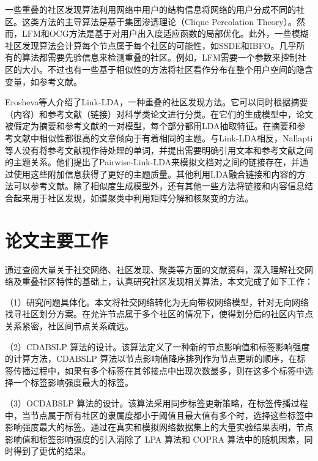 一些重叠的社区发现算法利用网络中用户的结构信息将网络的用户分成不同的社区。这类方法的主导算法是基于集团渗透理论（Clique Percolation Theory）\cite{Palla2005Uncovering}。然而，LFM和OCG方法是基于对用户出入度适应函数的局部优化\cite{Lancichinetti2012Detecting,Becker2012Multifunctional}。此外，一些模糊社区发现算法会计算每个节点属于每个社区的可能性，如SSDE和IBFO\cite{Magdon2010SSDE,Lei2013Clustering}。几乎所有的算法都需要先验信息来检测重叠的社区。例如，LFM需要一个参数来控制社区的大小。不过也有一些基于相似性的方法将社区看作分布在整个用户空间的隐含变量，如参考文献\cite{Ren2007A}。

Erosheva等人\cite{Erosheva2004Mixed}介绍了Link-LDA，一种重叠的社区发现方法。它可以同时根据摘要（内容）和参考文献（链接）对科学类论文进行分类。在它们的生成模型中，论文被假定为摘要和参考文献的一对模型，每个部分都用LDA抽取特征。在摘要和参考文献中相似性都很高的文章倾向于有着相同的主题。与Link-LDA相反，Nallapti等人\cite{Nallapati2008Joint}没有将参考文献视作待处理的单词，并提出需要明确引用文本和参考文献之间的主题关系。他们提出了Pairwise-Link-LDA来模拟文档对之间的链接存在，并通过使用这些附加信息获得了更好的主题质量。其他利用LDA融合链接和内容的方法可以参考文献\cite{Dietz2007Unsupervised,Gruber2008Latent}。除了相似度生成模型外，还有其他一些方法将链接和内容信息结合起来用于社区发现，如谱聚类中利用矩阵分解和核聚变的方法\cite{Zhu2007Combining,Yu2008Clustering}。

\section{论文主要工作}


通过查阅大量关于社交网络、社区发现、聚类等方面的文献资料，深入理解社交网络及重叠社区特性的基础上，认真研究社区发现相关算法，本文完成了如下工作：

（1）研究问题具体化。本文将社交网络转化为无向带权网络模型，针对无向网络找寻社区划分方案。在允许节点属于多个社区的情况下，使得划分后的社区内节点关系紧密，社区间节点关系疏远。

（2）CDABSLP 算法的设计。该算法定义了一种新的节点影响值和标签影响强度的计算方法，CDABSLP 算法以节点影响值降序排列作为节点更新的顺序，在标签传播过程中，如果有多个标签在其邻接点中出现次数最多，则在这多个标签中选择一个标签影响强度最大的标签。

（3）OCDABSLP 算法的设计。该算法采用同步标签更新策略，在标签传播过程中，当节点属于所有社区的隶属度都小于阈值且最大值有多个时，选择这些标签中影响强度最大的标签。通过在真实和模拟网络数据集上的大量实验结果表明，节点影响值和标签影响强度的引入消除了 LPA 算法和 COPRA 算法中的随机因素，同时得到了更优的结果。 


